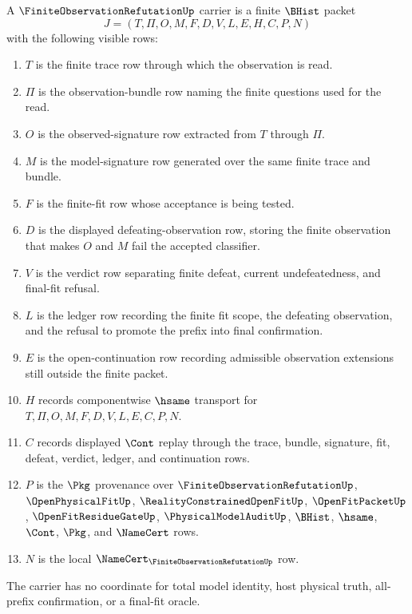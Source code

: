 \begin{definition}
\label{def:finite-observation-refutation-carrier}
A $\FiniteObservationRefutationUp$ carrier is a finite $\BHist$ packet
$$
J=(T,\Pi,O,M,F,D,V,L,E,H,C,P,N)
$$
with the following visible rows:
\begin{enumerate}
\item $T$ is the finite trace row through which the observation is read.
\item $\Pi$ is the observation-bundle row naming the finite questions used for the read.
\item $O$ is the observed-signature row extracted from $T$ through $\Pi$.
\item $M$ is the model-signature row generated over the same finite trace and bundle.
\item $F$ is the finite-fit row whose acceptance is being tested.
\item $D$ is the displayed defeating-observation row, storing the finite observation that makes $O$ and $M$ fail the accepted classifier.
\item $V$ is the verdict row separating finite defeat, current undefeatedness, and final-fit refusal.
\item $L$ is the ledger row recording the finite fit scope, the defeating observation, and the refusal to promote the prefix into final confirmation.
\item $E$ is the open-continuation row recording admissible observation extensions still outside the finite packet.
\item $H$ records componentwise $\hsame$ transport for $T,\Pi,O,M,F,D,V,L,E,C,P,N$.
\item $C$ records displayed $\Cont$ replay through the trace, bundle, signature, fit, defeat, verdict, ledger, and continuation rows.
\item $P$ is the $\Pkg$ provenance over $\FiniteObservationRefutationUp$, $\OpenPhysicalFitUp$, $\RealityConstrainedOpenFitUp$, $\OpenFitPacketUp$, $\OpenFitResidueGateUp$, $\PhysicalModelAuditUp$, $\BHist$, $\hsame$, $\Cont$, $\Pkg$, and $\NameCert$ rows.
\item $N$ is the local $\NameCert_{\FiniteObservationRefutationUp}$ row.
\end{enumerate}
The carrier has no coordinate for total model identity, host physical truth, all-prefix confirmation, or a final-fit oracle.
\end{definition}


